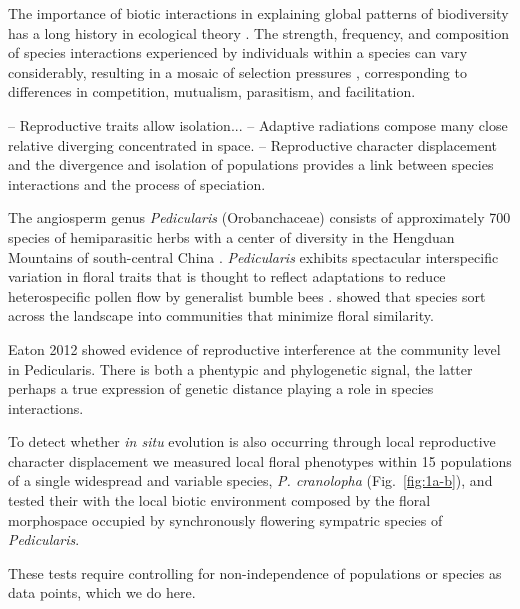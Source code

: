 \documentclass[12pt,letterpaper]{article}
\begin{document}
The importance of biotic interactions in explaining global patterns of biodiversity has a long history in ecological theory \citep{schemske_2009}. The strength, frequency, and composition of species interactions experienced by individuals within a species can vary considerably, resulting in a mosaic of selection pressures \citep{thompson}, corresponding to differences in competition, mutualism, parasitism, and facilitation. 

--  Reproductive traits allow isolation...
--  Adaptive radiations compose many close relative diverging 
    concentrated in space. 
--  Reproductive character displacement
    and the divergence and isolation of populations provides a 
    link between species interactions and the process of speciation.


The angiosperm genus \emph{Pedicularis} (Orobanchaceae)
consists of approximately 700 species of hemiparasitic herbs 
with a center of diversity in the Hengduan Mountains of south-central China
\citep{yang_flora_1998}. \emph{Pedicularis} exhibits spectacular 
interspecific variation in floral traits that is thought to 
reflect adaptations to reduce 
heterospecific pollen flow by generalist bumble bees
\citep{macior_pollination_1983, grant_modes_1994}. 
\cite{eaton_floral_2012} showed that species sort across the 
landscape into communities that minimize floral similarity. 



Eaton 2012 showed evidence of reproductive interference at the community level in Pedicularis. There is both a phentypic and phylogenetic signal, the latter perhaps a true expression of genetic distance playing a role in species interactions. 

To detect whether \emph{in situ} evolution is also occurring 
through local reproductive character displacement we measured
local floral phenotypes within 15 populations of a single 
widespread and variable species, \emph{P. cranolopha}
(Fig.~\ref{fig:1a-b}), and tested their with the local biotic 
environment composed by the floral morphospace occupied by 
synchronously flowering sympatric species of \emph{Pedicularis}. 

These tests require controlling for non-independence of populations or species as data points, which we do here. 
\end{document}
